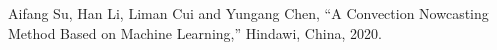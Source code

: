 \begin{thebibliography}{99}
 Aifang Su, Han Li, Liman Cui and Yungang Chen, “A Convection Nowcasting Method Based on Machine Learning,” Hindawi, China, 2020.
\end{thebibliography}